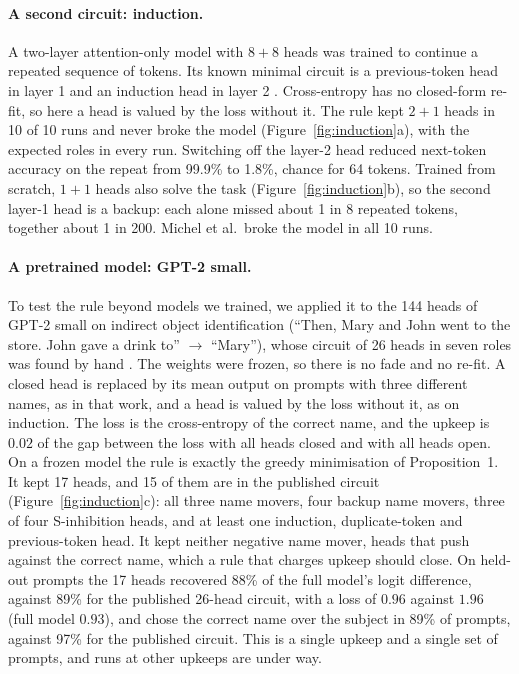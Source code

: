 \documentclass[letterpaper]{article} %
\begin{document}
\paragraph{A second circuit: induction.} A two-layer attention-only model with $8+8$ heads was trained to continue a repeated sequence of tokens. Its known minimal circuit is a previous-token head in layer 1 and an induction head in layer 2 \citep{olsson2022}. Cross-entropy has no closed-form re-fit, so here a head is valued by the loss without it. The rule kept $2+1$ heads in 10 of 10 runs and never broke the model (Figure~\ref{fig:induction}a), with the expected roles in every run. Switching off the layer-2 head reduced next-token accuracy on the repeat from 99.9\% to 1.8\%, chance for 64 tokens. Trained from scratch, $1+1$ heads also solve the task (Figure~\ref{fig:induction}b), so the second layer-1 head is a backup: each alone missed about 1 in 8 repeated tokens, together about 1 in 200. Michel et al.\ broke the model in all 10 runs.

\paragraph{A pretrained model: GPT-2 small.} To test the rule beyond models we trained, we applied it to the 144 heads of GPT-2 small on indirect object identification (``Then, Mary and John went to the store. John gave a drink to'' $\to$ ``Mary''), whose circuit of 26 heads in seven roles was found by hand \citep{wang2023interpretability}. The weights were frozen, so there is no fade and no re-fit. A closed head is replaced by its mean output on prompts with three different names, as in that work, and a head is valued by the loss without it, as on induction. The loss is the cross-entropy of the correct name, and the upkeep is $0.02$ of the gap between the loss with all heads closed and with all heads open. On a frozen model the rule is exactly the greedy minimisation of Proposition~1. It kept 17 heads, and 15 of them are in the published circuit (Figure~\ref{fig:induction}c): all three name movers, four backup name movers, three of four S-inhibition heads, and at least one induction, duplicate-token and previous-token head. It kept neither negative name mover, heads that push against the correct name, which a rule that charges upkeep should close. On held-out prompts the 17 heads recovered 88\% of the full model's logit difference, against 89\% for the published 26-head circuit, with a loss of $0.96$ against $1.96$ (full model $0.93$), and chose the correct name over the subject in 89\% of prompts, against 97\% for the published circuit. This is a single upkeep and a single set of prompts, and runs at other upkeeps are under way.
\end{document}
